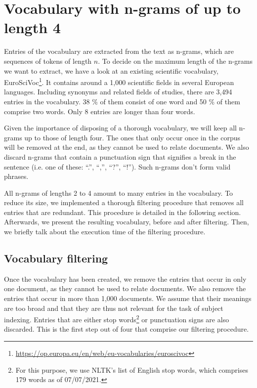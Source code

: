 \section{Vocabulary with n-grams of up to length 4} \label{appendix_ngram_vocab}

Entries of the vocabulary are extracted from the text as n-grams, which are sequences of tokens of length $n$. To decide on the maximum length of the n-grams we want to extract, we have a look at an existing scientific vocabulary, EuroSciVoc\footnote{\url{https://op.europa.eu/en/web/eu-vocabularies/euroscivoc}}. It contains around a 1,000 scientific fields in several European languages. Including synonyms and related fields of studies, there are 3,494 entries in the vocabulary. 38 \% of them consist of one word and 50 \% of them comprise two words. Only 8 entries are longer than four words.

Given the importance of disposing of a thorough vocabulary, we will keep all n-grams up to those of length four. The ones that only occur once in the corpus will be removed at the end, as they cannot be used to relate documents. We also discard n-grams that contain a punctuation sign that signifies a break in the sentence (i.e. one of these: ``.'', ``,'', ``?'', ``!''). Such n-grams don't form valid phrases.

All n-grams of lengths 2 to 4 amount to many entries in the vocabulary. To reduce its size, we implemented a thorough filtering procedure that removes all entries that are redundant. This procedure is detailed in the following section. Afterwards, we present the resulting vocabulary, before and after filtering. Then, we briefly talk about the execution time of the filtering procedure.


\subsection{Vocabulary filtering} \label{vocab_filtering_ngrams}

Once the vocabulary has been created, we remove the entries that occur in only one document, as they cannot be used to relate documents. We also remove the entries that occur in more than 1,000 documents. We assume that their meanings are too broad and that they are thus not relevant for the task of subject indexing. Entries that are either stop words\footnote{For this purpose, we use NLTK's list of English stop words, which comprises 179 words as of 07/07/2021.} or punctuation signs are also discarded. This is the first step out of four that comprise our filtering procedure.

